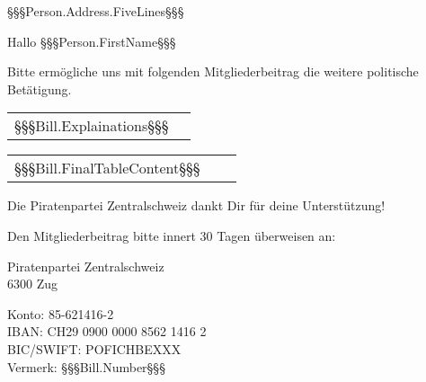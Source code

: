 ﻿\documentclass[ppsletter,fontsize=11pt,foldmarks=false ]{scrlttr2}
\begin{document}


\begin{letter}{%
    §§§Person.Address.FiveLines§§§
}

\enlargethispage{2cm}

\opening{Hallo §§§Person.FirstName§§§}

Bitte ermögliche uns mit folgenden Mitgliederbeitrag die weitere politische Betätigung.

\vspace{0.2cm}

\begin{tabular}{ l r }
§§§Bill.Explainations§§§
\end{tabular}

\vspace{0.2cm}

\begin{tabular}{ l r r }
§§§Bill.FinalTableContent§§§
\end{tabular}

\vspace{0.2cm}

Die Piratenpartei Zentralschweiz dankt Dir für deine Unterstützung!

\vspace{1cm}
Den Mitgliederbeitrag bitte innert 30 Tagen überweisen an:

Piratenpartei Zentralschweiz \\
6300 Zug

Konto: 85-621416-2 \\
IBAN: CH29 0900 0000 8562 1416 2 \\
BIC/SWIFT: POFICHBEXXX \\
Vermerk: §§§Bill.Number§§§

\end{letter}%
\end{document}

